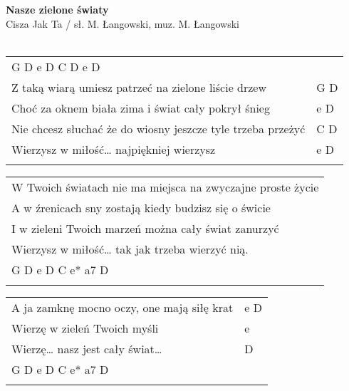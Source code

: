 \documentclass[a5paper]{article}
\begin{document}


\noindent
\fontsize{12pt}{15pt}\selectfont
\textbf{Nasze zielone światy} \\
\fontsize{8pt}{10pt}\selectfont
Cisza Jak Ta / sł. M. Łangowski, muz. M. Łangowski \\ \\
\fontsize{10pt}{12pt}\selectfont
{}
\begin{tabular}{@{}p{9.50cm}p{3cm}@{}}
\noindent
G D e D C D e D & \\
Z taką wiarą umiesz patrzeć na zielone liście drzew & G D \\
Choć za oknem biała zima i świat cały pokrył śnieg & e D \\
Nie chcesz słuchać że do wiosny  jeszcze  tyle trzeba przeżyć & C D \\
Wierzysz w miłość… najpiękniej wierzysz & e D \\ \\
\end{tabular}

\noindent
\begin{tabular}{@{}p{9.50cm}@{}}
W Twoich światach nie ma miejsca na zwyczajne proste życie \\
A w źrenicach sny zostają kiedy budzisz się o świcie \\
I w zieleni Twoich marzeń można cały świat zanurzyć \\
Wierzysz w miłość… tak jak trzeba wierzyć nią. \\
G D e D C e* a7 D \\ \\
\end{tabular}

\noindent
\begin{tabular}{@{}p{9.50cm}p{3cm}@{}}
A ja zamknę mocno oczy, one mają siłę krat & e D \\
Wierzę w zieleń Twoich myśli & e \\
Wierzę… nasz jest cały świat… & D \\
G D e D C e* a7 D & \\ \\
\end{tabular}
\end{document}

